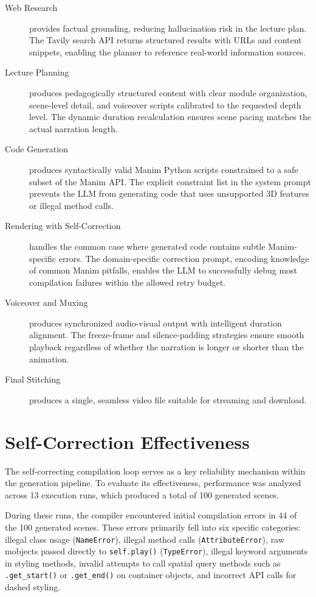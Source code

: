 \documentclass[12pt,a4paper,twoside,openright]{report}
\begin{document}
\begin{description}
  \item[Web Research] provides factual grounding, reducing hallucination risk in the lecture plan. The Tavily search API returns structured results with URLs and content snippets, enabling the planner to reference real-world information sources.
  \item[Lecture Planning] produces pedagogically structured content with clear module organization, scene-level detail, and voiceover scripts calibrated to the requested depth level. The dynamic duration recalculation ensures scene pacing matches the actual narration length.
  \item[Code Generation] produces syntactically valid Manim Python scripts constrained to a safe subset of the Manim API. The explicit constraint list in the system prompt prevents the LLM from generating code that uses unsupported 3D features or illegal method calls.
  \item[Rendering with Self-Correction] handles the common case where generated code contains subtle Manim-specific errors. The domain-specific correction prompt, encoding knowledge of common Manim pitfalls, enables the LLM to successfully debug most compilation failures within the allowed retry budget.
  \item[Voiceover and Muxing] produces synchronized audio-visual output with intelligent duration alignment. The freeze-frame and silence-padding strategies ensure smooth playback regardless of whether the narration is longer or shorter than the animation.
  \item[Final Stitching] produces a single, seamless video file suitable for streaming and download.
\end{description}

\section{Self-Correction Effectiveness}

The self-correcting compilation loop serves as a key reliability mechanism within the generation pipeline. To evaluate its effectiveness, performance was analyzed across 13 execution runs, which produced a total of 100 generated scenes. 

During these runs, the compiler encountered initial compilation errors in 44 of the 100 generated scenes. These errors primarily fell into six specific categories: illegal class usage (\texttt{NameError}), illegal method calls (\texttt{AttributeError}), raw mobjects passed directly to \texttt{self.play()} (\texttt{TypeError}), illegal keyword arguments in styling methods, invalid attempts to call spatial query methods such as \texttt{.get\_start()} or \texttt{.get\_end()} on container objects, and incorrect API calls for dashed styling.
\end{document}
